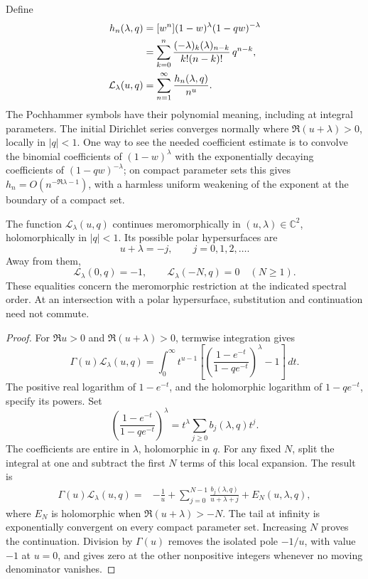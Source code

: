 Define
\begin{align}
 h_n(\lambda,q)
 &=[w^n](1-w)^\lambda(1-qw)^{-\lambda}\notag\\
 &=\sum_{k=0}^n
   \frac{(-\lambda)_k(\lambda)_{n-k}}{k!(n-k)!}\,q^{n-k},
 \label{bhr:cxp:eq:hn}\\
 \mathcal L_\lambda(u,q)
 &=\sum_{n=1}^{\infty}\frac{h_n(\lambda,q)}{n^u}.
 \label{bhr:cxp:eq:L}
\end{align}
The Pochhammer symbols have their polynomial meaning, including at
integral parameters.  The initial Dirichlet series converges normally
where \(\Re(u+\lambda)>0\), locally in \(|q|<1\).  One way to see
the needed coefficient estimate is to convolve the binomial
coefficients of \((1-w)^\lambda\) with the exponentially decaying
coefficients of \((1-qw)^{-\lambda}\); on compact parameter sets this
gives \(h_n=O(n^{-\Re\lambda-1})\), with a harmless uniform weakening
of the exponent at the boundary of a compact set.

\begin{theorem}
\label{bhr:cxp:thm:L}
The function \(\mathcal L_\lambda(u,q)\) continues meromorphically
in \((u,\lambda)\in\mathbb C^2\), holomorphically in \(|q|<1\).
Its possible polar hypersurfaces are
\[
 u+\lambda=-j,\qquad j=0,1,2,\ldots.
\]
Away from them,
\[
 \mathcal L_\lambda(0,q)=-1,\qquad
 \mathcal L_\lambda(-N,q)=0\quad(N\ge1).
\]
These equalities concern the meromorphic restriction at the indicated
spectral order.  At an intersection with a polar hypersurface,
substitution and continuation need not commute.
\end{theorem}

\begin{proof}
For \(\Re u>0\) and \(\Re(u+\lambda)>0\), termwise integration
gives
\begin{equation}\label{bhr:cxp:eq:mellin}
 \Gamma(u)\mathcal L_\lambda(u,q)
 =\int_0^\infty t^{u-1}
 \left[
 \left(\frac{1-e^{-t}}{1-qe^{-t}}\right)^\lambda-1
 \right]\,dt.
\end{equation}
The positive real logarithm of \(1-e^{-t}\), and the holomorphic
logarithm of \(1-qe^{-t}\), specify its powers.  Set
\[
 \left(\frac{1-e^{-t}}{1-qe^{-t}}\right)^\lambda
   =t^\lambda\sum_{j\ge0}b_j(\lambda,q)t^j.
\]
The coefficients are entire in \(\lambda\), holomorphic in \(q\).
For any fixed \(N\), split the integral at one and subtract the
first \(N\) terms of this local expansion.  The result is
\begin{align}
 \Gamma(u)\mathcal L_\lambda(u,q)
 ={}&-\frac1u+
   \sum_{j=0}^{N-1}\frac{b_j(\lambda,q)}{u+\lambda+j}
   +E_N(u,\lambda,q),\label{bhr:cxp:eq:subtraction}
\end{align}
where \(E_N\) is holomorphic when \(\Re(u+\lambda)>-N\).
The tail at infinity is exponentially convergent on every compact
parameter set.  Increasing \(N\) proves the continuation.  Division
by \(\Gamma(u)\) removes the isolated pole \(-1/u\), with value
\(-1\) at \(u=0\), and gives zero at the other nonpositive
integers whenever no moving denominator vanishes.
\end{proof}

